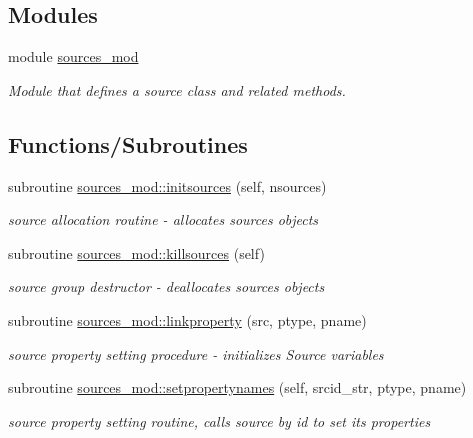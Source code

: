 \subsection*{Modules}
\begin{DoxyCompactItemize}
\item 
module \mbox{\hyperlink{namespacesources__mod}{sources\+\_\+mod}}
\begin{DoxyCompactList}\small\item\em Module that defines a source class and related methods. \end{DoxyCompactList}\end{DoxyCompactItemize}
\subsection*{Functions/\+Subroutines}
\begin{DoxyCompactItemize}
\item 
subroutine \mbox{\hyperlink{namespacesources__mod_a6da3303e5c39d77c0111ec50623bf5fe}{sources\+\_\+mod\+::initsources}} (self, nsources)
\begin{DoxyCompactList}\small\item\em source allocation routine -\/ allocates sources objects \end{DoxyCompactList}\item 
subroutine \mbox{\hyperlink{namespacesources__mod_aee745aa084adcfa41ecfc3469b90aa8e}{sources\+\_\+mod\+::killsources}} (self)
\begin{DoxyCompactList}\small\item\em source group destructor -\/ deallocates sources objects \end{DoxyCompactList}\item 
subroutine \mbox{\hyperlink{namespacesources__mod_a683ca7e4aca7a0050aad9f506569fca9}{sources\+\_\+mod\+::linkproperty}} (src, ptype, pname)
\begin{DoxyCompactList}\small\item\em source property setting procedure -\/ initializes Source variables \end{DoxyCompactList}\item 
subroutine \mbox{\hyperlink{namespacesources__mod_aa76f16f8ee96bc86b553aa54d420321c}{sources\+\_\+mod\+::setpropertynames}} (self, srcid\+\_\+str, ptype, pname)
\begin{DoxyCompactList}\small\item\em source property setting routine, calls source by id to set its properties \end{DoxyCompactList}\item 

\end{DoxyCompactItemize}
